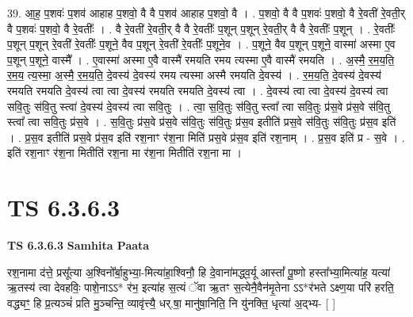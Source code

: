 \documentclass[17pt]{extarticle}
\begin{document}
39. आ॒ह॒ प॒शवः॑ प॒शव॑ आहाह प॒शवो॒ वै वै प॒शव॑ आहाह प॒शवो॒ वै । . प॒शवो॒ वै वै प॒शवः॑ प॒शवो॒ वै रे॒वती॑ रे॒वती॒र् वै प॒शवः॑ प॒शवो॒ वै रे॒वतीः᳚ । . वै रे॒वती॑ रे॒वती॒र् वै वै रे॒वतीः᳚ प॒शून् प॒शून् रे॒वती॒र् वै वै रे॒वतीः᳚ प॒शून् । . रे॒वतीः᳚ प॒शून् प॒शून् रे॒वती॑ रे॒वतीः᳚ प॒शूने॒ वैव प॒शून् रे॒वती॑ रे॒वतीः᳚ प॒शूने॒व । . प॒शूने॒ वैव प॒शून् प॒शूने॒ वास्मा॑ अस्मा ए॒व प॒शून् प॒शूने॒ वास्मै᳚ । . ए॒वास्मा॑ अस्मा ए॒वै वास्मै॑ रमयति रमय त्यस्मा ए॒वै वास्मै॑ रमयति । . अ॒स्मै॒ र॒म॒य॒ति॒ र॒म॒य॒ त्य॒स्मा॒ अ॒स्मै॒ र॒म॒य॒ति॒ दे॒वस्य॑ दे॒वस्य॑ रमय त्यस्मा अस्मै रमयति दे॒वस्य॑ । . र॒म॒य॒ति॒ दे॒वस्य॑ दे॒वस्य॑ रमयति रमयति दे॒वस्य॑ त्वा त्वा दे॒वस्य॑ रमयति रमयति दे॒वस्य॑ त्वा । . दे॒वस्य॑ त्वा त्वा दे॒वस्य॑ दे॒वस्य॑ त्वा सवि॒तुः स॑वि॒तु स्त्वा॑ दे॒वस्य॑ दे॒वस्य॑ त्वा सवि॒तुः । . त्वा॒ स॒वि॒तुः स॑वि॒तु स्त्वा᳚ त्वा सवि॒तुः प्र॑स॒वे प्र॑स॒वे स॑वि॒तु स्त्वा᳚ त्वा सवि॒तुः प्र॑स॒वे । . स॒वि॒तुः प्र॑स॒वे प्र॑स॒वे स॑वि॒तुः स॑वि॒तुः प्र॑स॒व इतीति॑ प्रस॒वे स॑वि॒तुः स॑वि॒तुः प्र॑स॒व इति॑ । . प्र॒स॒व इतीति॑ प्रस॒वे प्र॑स॒व इति॑ रश॒नाꣳ र॑श॒ना मिति॑ प्रस॒वे प्र॑स॒व इति॑ रश॒नाम् । . प्र॒स॒व इति॑ प्र - स॒वे । . इति॑ रश॒नाꣳ र॑श॒ना मितीति॑ रश॒ना मा र॑श॒ना मितीति॑ रश॒ना मा । \newline
\pagebreak
{}

\section{ TS 6.3.6.3 }

\textbf{TS 6.3.6.3 } \newline
\textbf{Samhita Paata} \newline

रश॒नामा द॑त्ते॒ प्रसू᳚त्या अ॒श्विनो᳚र्बा॒हुभ्या॒-मित्या॑हा॒श्विनौ॒ हि दे॒वाना॑मद्ध्व॒र्यू आस्तां᳚ पू॒ष्णो हस्ता᳚भ्या॒मित्या॑ह॒ यत्या॑ ऋ॒तस्य॑ त्वा देवहविः॒ पाशे॒नाऽऽ* र॑भ॒ इत्या॑ह स॒त्यं ॅवा ऋ॒तꣳ स॒त्येनै॒वैन॑मृ॒तेना ऽऽ*र॑भते ऽक्ष्ण॒या परि॑ हरति॒ वद्ध्यꣳ॒॒ हि प्र॒त्यञ्चं॑ प्रति मु॒ञ्चन्ति॒ व्यावृ॑त्त्यै॒ धर्.षा॒ मानु॑षा॒निति॒ नि यु॑नक्ति॒ धृत्या॑ अ॒द्भ्य- [  ] \newline
\end{document}
